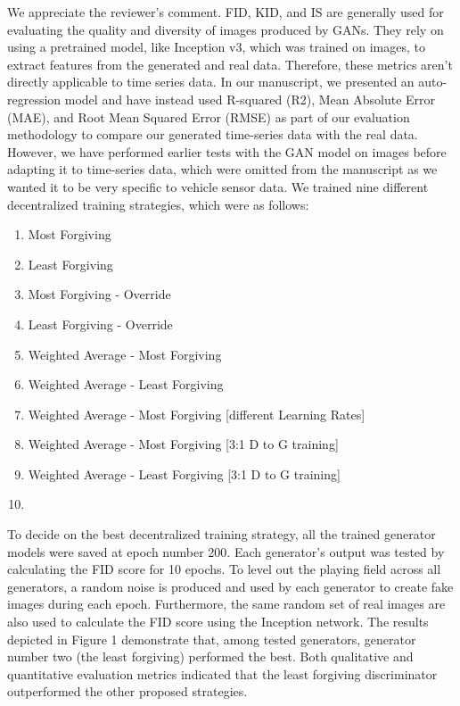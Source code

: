 \documentclass{article}
\begin{document}
\AR We appreciate the reviewer's comment. FID, KID, and IS are generally used for evaluating the quality and diversity of images produced by GANs. They rely on using a pretrained model, like Inception v3, which was trained on images, to extract features from the generated and real data. Therefore, these metrics aren't directly applicable to time series data. In our manuscript, we presented an auto-regression model and have instead used R-squared (R2), Mean Absolute Error (MAE), and Root Mean Squared Error (RMSE) as part of our evaluation methodology to compare our generated time-series data with the real data. However, we have performed earlier tests with the GAN model on images before adapting it to time-series data, which were omitted from the manuscript as we wanted it to be very specific to vehicle sensor data.
\newline
We trained nine different decentralized training strategies, which were as follows: 
\setlength{\columnsep}{-3cm}
\begin{multicols}{2}[\small]
\begin{enumerate}
    \item Most Forgiving
    \item Least Forgiving
    \item Most Forgiving - Override
    \item Least Forgiving - Override
    \item Weighted Average - Most Forgiving
    \item Weighted Average - Least Forgiving
    \item Weighted Average - Most Forgiving [different Learning Rates]
    \item Weighted Average - Most Forgiving [3:1 D to G training]
    \item Weighted Average - Least Forgiving [3:1 D to G training]
    \item[]
\end{enumerate}
\end{multicols}
\newline
To decide on the best decentralized training strategy, all the trained generator models were saved at epoch number 200. Each generator's output was tested by calculating the FID score for 10 epochs. To level out the playing field across all generators, a random noise is produced and used by each generator to create fake images during each epoch. Furthermore, the same random set of real images are also used to calculate the FID score using the Inception network.
\newline
The results depicted in Figure 1 demonstrate that, among tested generators, generator number two (the least forgiving) performed the best. Both qualitative and quantitative evaluation metrics indicated that the least forgiving discriminator outperformed the other proposed strategies.

\end{document}
